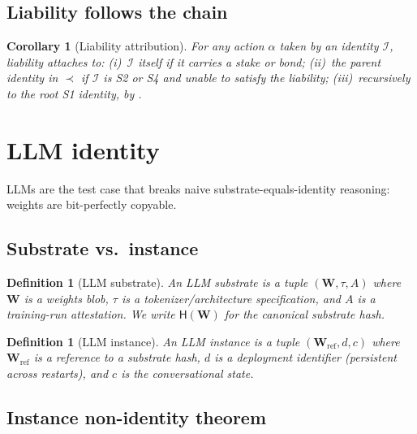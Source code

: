 \documentclass[11pt,a4paper,parskip=half-,DIV=12,headings=standardclasses]{scrartcl}
\theoremstyle{ncthm}
\newtheorem{corollary}[theorem]{Corollary}
\theoremstyle{ncdef}
\newtheorem{definition}[theorem]{Definition}
\newcommand{\identity}{\mathcal{I}}
\newcommand{\Hash}{\mathsf{H}}
\begin{document}
\subsection{Liability follows the chain}

\begin{corollary}[Liability attribution]\label{cor:liability}
For any action $\alpha$ taken by an identity $\identity$, liability
attaches to: (i)~$\identity$ itself if it carries a stake or bond;
(ii)~the parent identity in $\prec$ if $\identity$ is S2 or S4 and
unable to satisfy the liability; (iii)~recursively to the root S1
identity, by .
\end{corollary}

\section{LLM identity}\label{sec:llm}

LLMs are the test case that breaks naive substrate-equals-identity
reasoning: weights are bit-perfectly copyable.

\subsection{Substrate vs.\ instance}

\begin{definition}[LLM substrate]\label{def:llm-substrate}
An \emph{LLM substrate} is a tuple $(\mathbf{W}, \tau, A)$ where
$\mathbf{W}$ is a weights blob, $\tau$ is a tokenizer/architecture
specification, and $A$ is a training-run attestation. We write
$\Hash(\mathbf{W})$ for the canonical substrate hash.
\end{definition}

\begin{definition}[LLM instance]\label{def:llm-instance}
An \emph{LLM instance} is a tuple
$(\mathbf{W}_{\mathrm{ref}}, d, c)$ where $\mathbf{W}_{\mathrm{ref}}$
is a reference to a substrate hash, $d$ is a deployment identifier
(persistent across restarts), and $c$ is the conversational state.
\end{definition}

\subsection{Instance non-identity theorem}
\end{document}
